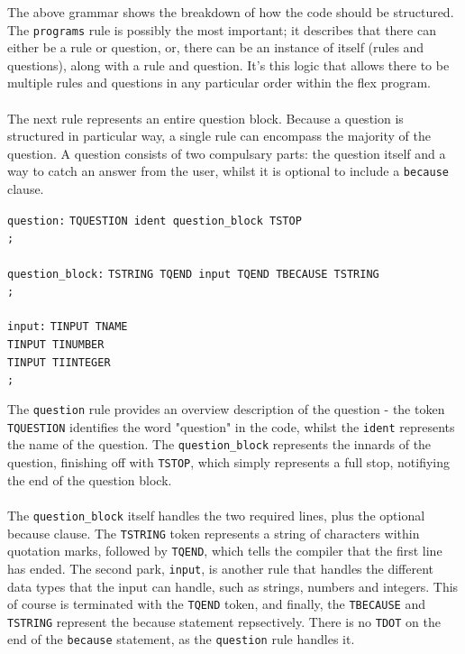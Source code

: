 \documentclass[12pt]{report}
\begin{document}
The above grammar shows the breakdown of how the code should be structured.  The \texttt{programs} rule is possibly the most important; it describes that there can either be a rule or question, or, there can be an instance of itself (rules and questions), along with a rule and question.  It's this logic that allows there to be multiple rules and questions in any particular order within the flex program.\\
\\
The next rule represents an entire question block.  Because a question is structured in particular way, a single rule can encompass the majority of the question.  A question consists of two compulsary parts: the question itself and a way to catch an answer from the user, whilst it is optional to include a \texttt{because} clause.\\
\begin{tabbing}
	\texttt{question:} \= \texttt{TQUESTION ident question\_block TSTOP}\\
	\> \texttt{;}\\
	\\
	\texttt{question\_block:} \= \texttt{TSTRING TQEND input TQEND TBECAUSE TSTRING}\\
	\> \texttt{;}\\
	\\
	\texttt{input:} \= \texttt{TINPUT TNAME}\\
	\> \texttt{\textbar \space TINPUT TINUMBER}\\
	\> \texttt{\textbar \space TINPUT TIINTEGER}\\
	\> \texttt{;}\\
\end{tabbing}
The \texttt{question} rule provides an overview description of the question - the token \texttt{TQUESTION} identifies the word "question" in the code, whilst the \texttt{ident} represents the name of the question.  The \texttt{question\_block} represents the innards of the question, finishing off with \texttt{TSTOP}, which simply represents a full stop, notifiying the end of the question block.\\
\\
The \texttt{question\_block} itself handles the two required lines, plus the optional because clause.  The \texttt{TSTRING} token represents a string of characters within quotation marks, followed by \texttt{TQEND}, which tells the compiler that the first line has ended.  The second park, \texttt{input}, is another rule that handles the different data types that the input can handle, such as strings, numbers and integers.  This of course is terminated with the \texttt{TQEND} token, and finally, the \texttt{TBECAUSE} and \texttt{TSTRING} represent the because statement repsectively.  There is no \texttt{TDOT} on the end of the \texttt{because} statement, as the \texttt{question} rule handles it.\\
\end{document}
